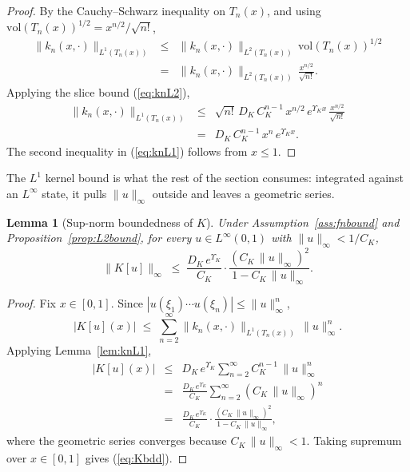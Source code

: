 \documentclass[10pt,a4paper]{amsart}
\newtheorem{lemma}{Lemma}
\newcommand{\Linf}{L^\infty}
\newcommand{\Ltwo}{L^2}
\begin{document}
\begin{proof}
By the Cauchy--Schwarz inequality on $T_n(x)$, and using $\mathrm{vol}(T_n(x))^{1/2} = x^{n/2}/\sqrt{n!}$,
\begin{eqnarray}
\|k_n(x,\cdot)\|_{L^1(T_n(x))} &\le& \|k_n(x,\cdot)\|_{\Ltwo(T_n(x))}\, \mathrm{vol}(T_n(x))^{1/2} \nonumber \\
&=& \|k_n(x,\cdot)\|_{\Ltwo(T_n(x))}\,\frac{x^{n/2}}{\sqrt{n!}}.
\label{eq:L1_CS}
\end{eqnarray}
Applying the slice bound (\ref{eq:knL2}),
\begin{eqnarray}
\|k_n(x,\cdot)\|_{L^1(T_n(x))} &\le& \sqrt{n!}\, D_K\, C_K^{n-1}\, x^{n/2}\, e^{\Upsilon_K x}\,\frac{x^{n/2}}{\sqrt{n!}} \nonumber \\
&=& D_K\, C_K^{n-1}\, x^n\, e^{\Upsilon_K x}.
\label{eq:L1_applied}
\end{eqnarray}
The second inequality in (\ref{eq:knL1}) follows from $x \le 1$.
\end{proof}

The $L^1$ kernel bound is what the rest of the section consumes: integrated against an $\Linf$ state, it pulls $\|u\|_\infty$ outside and leaves a geometric series.

\begin{lemma}[Sup-norm boundedness of $K$]\label{lem:Kbdd}
Under Assumption~\ref{ass:fnbound} and Proposition~\ref{prop:L2bound}, for every $u \in \Linf(0,1)$ with $\|u\|_\infty < 1/C_K$,
\begin{equation}
\|K[u]\|_\infty \;\le\; \frac{D_K\, e^{\Upsilon_K}}{C_K}\cdot \frac{(C_K\,\|u\|_\infty)^2}{1 - C_K\,\|u\|_\infty}.
\label{eq:Kbdd}
\end{equation}
\end{lemma}

\begin{proof}
Fix $x \in [0,1]$. Since $|u(\xi_1)\cdots u(\xi_n)| \le \|u\|_\infty^n$,
\begin{equation}
|K[u](x)| \;\le\; \sum_{n=2}^\infty \|k_n(x,\cdot)\|_{L^1(T_n(x))}\,\|u\|_\infty^n.
\label{eq:K_sum}
\end{equation}
Applying Lemma~\ref{lem:knL1},
\begin{eqnarray}
|K[u](x)| &\le& D_K\, e^{\Upsilon_K}\sum_{n=2}^\infty C_K^{n-1}\,\|u\|_\infty^n \nonumber \\
&=& \frac{D_K\, e^{\Upsilon_K}}{C_K}\sum_{n=2}^\infty (C_K\,\|u\|_\infty)^n \nonumber \\
&=& \frac{D_K\, e^{\Upsilon_K}}{C_K}\cdot\frac{(C_K\,\|u\|_\infty)^2}{1 - C_K\,\|u\|_\infty},
\label{eq:K_geom}
\end{eqnarray}
where the geometric series converges because $C_K\,\|u\|_\infty < 1$. Taking supremum over $x \in [0,1]$ gives (\ref{eq:Kbdd}).
\end{proof}
\end{document}

